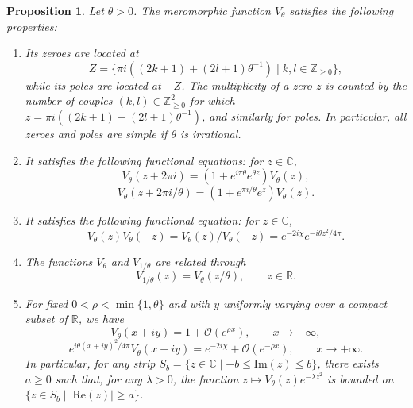 \documentclass[11pt, reqno]{amsart}
\newtheorem{prop}[theorem]{Proposition}
\theoremstyle{definition}
\numberwithin{equation}{section}
\def\C{\mathbb C}
\def\Oc{\mathcal O}
\def\R{\mathbb R}
\def\Z{\mathbb Z}
\newcommand{\Imm}{\mathrm{Im}}
\newcommand{\Ree}{\mathrm{Re}}
\begin{document}
\begin{prop}\label{PropFundPropert}
Let $\theta>0$. The meromorphic function $V_{\theta}$ satisfies the following properties:
\begin{enumerate}
\item\label{Prop1} Its zeroes are located at 
\[
Z = \{\pi i \left((2k+1) + (2l+1)\theta^{-1}\right)\mid k,l\in \Z_{\geq0}\},
\]
while its poles are located at $-Z$. The multiplicity of a zero $z$ is counted by the number of couples $(k,l)\in \Z_{\geq0}^2$ for which $z= \pi i((2k+1) + (2l+1)\theta^{-1})$, and similarly for poles. In particular, all zeroes and poles are simple if $\theta$ is irrational. 
\item\label{Prop2} It satisfies the following functional equations: for $z\in \C$,
\begin{equation}\label{EqFunctEq1}
V_{\theta}(z+2\pi i) = (1+ e^{i \pi \theta}e^{\theta z})V_{\theta}(z),
\end{equation}
\begin{equation}\label{EqFunctEq2}
V_{\theta}(z+2\pi i/\theta) = (1+e^{\pi i/\theta}e^z)V_{\theta}(z).
\end{equation}
\item\label{Prop3} It satisfies the following functional equation: for $z\in \C$,
\begin{equation}\label{EqComplexConj}
V_{\theta}(z)V_{\theta}(-z)= V_{\theta}(z)/\overline{V_{\theta}(-\overline{z})} = e^{-2i\chi}e^{-i\theta z^2/4\pi}.
\end{equation}
\item\label{Prop4} The functions $V_{\theta}$ and $V_{1/\theta}$ are related through 
\begin{equation}\label{EqModDualityV}
V_{1/\theta}(z) = V_{\theta}(z/\theta),\qquad z\in \R.
\end{equation}
\item\label{Prop5}
For fixed $0<\rho < \min\{1,\theta\}$ and with $y$ uniformly varying over a compact subset of $\R$, we have
\begin{equation}\label{EqEstima1}
V_{\theta}(x+iy) = 1+ \Oc(e^{\rho x}),\qquad x \rightarrow -\infty,
\end{equation}
\begin{equation}\label{EqEstima2}
e^{i\theta (x+iy)^2/4\pi}V_{\theta}(x+iy) = e^{-2i\chi} + \Oc(e^{-\rho x}),\qquad x \rightarrow + \infty.
\end{equation}
In particular, for any strip $S_b = \{z\in \C\mid -b\leq\Imm(z)\leq b\}$, there exists $a\geq 0$ such that, for any $\lambda>0$, the function $z \mapsto V_{\theta}(z)e^{-\lambda z^2}$ is bounded on $\{z\in S_b\mid |\Ree(z)|\geq a\}$. 
\end{enumerate}
\end{prop}
\end{document}

